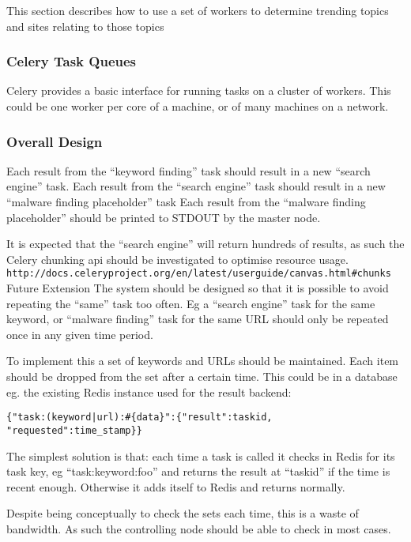 This section describes how to use a set of workers to determine trending topics and sites relating to those topics


\subsubsection{Celery Task Queues}
Celery provides a basic interface for running tasks on a cluster of workers. This could be one worker per core of a machine, or of many machines on a network.

\subsubsection{Overall Design}
Each result from the ``keyword finding'' task should result in a new ``search engine'' task.
Each result from the ``search engine'' task should result in a new ``malware finding placeholder'' task
Each result from the ``malware finding placeholder'' should be printed to STDOUT by the master node.

It is expected that the ``search engine'' will return hundreds of results, as such the Celery chunking api should be investigated to optimise resource usage. \verb`http://docs.celeryproject.org/en/latest/userguide/canvas.html#chunks`
Future Extension
The system should be designed so that it is possible to avoid repeating the ``same'' task too often. Eg a ``search engine'' task for the same keyword, or ``malware finding'' task for the same URL should only be repeated once in any given time period.

To implement this a set of keywords and URLs should be maintained. Each item should be dropped from the set after a certain time. This could be in a database eg. the existing Redis instance used for the result backend:

\verb/{"task:(keyword|url):#{data}":{"result":taskid, "requested":time_stamp}}/

The simplest solution is that: each time a task is called it checks in Redis for its task key, eg ``task:keyword:foo'' and returns the result at ``taskid'' if the time is recent enough. Otherwise it adds itself to Redis and returns normally.

Despite being conceptually to check the sets each time, this is a waste of bandwidth. As such the controlling node should be able to check in most cases.

